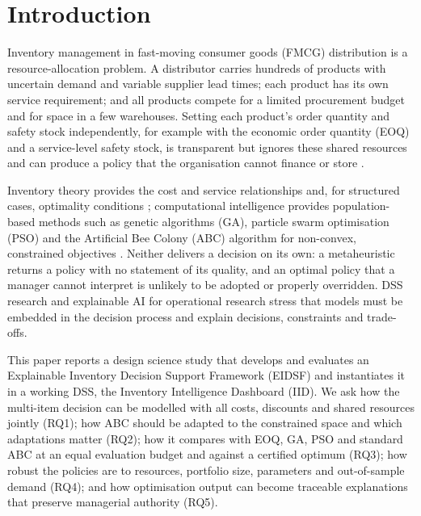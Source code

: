 \documentclass[preprint,12pt,authoryear]{elsarticle}
\begin{document}
\section{Introduction}\label{sec:intro}

Inventory management in fast-moving consumer goods (FMCG) distribution is a resource-allocation problem. A distributor carries hundreds of products with uncertain demand and variable supplier lead times; each product has its own service requirement; and all products compete for a limited procurement budget and for space in a few warehouses. Setting each product's order quantity and safety stock independently, for example with the economic order quantity (EOQ) and a service-level safety stock, is transparent but ignores these shared resources and can produce a policy that the organisation cannot finance or store \citep{Silver1998,Axsater2015,Zipkin2000}.

Inventory theory provides the cost and service relationships and, for structured cases, optimality conditions \citep{HadleyWhitin1963,RosenblattRothblum1990}; computational intelligence provides population-based methods such as genetic algorithms (GA), particle swarm optimisation (PSO) and the Artificial Bee Colony (ABC) algorithm for non-convex, constrained objectives \citep{Holland1975,Kennedy1995,Karaboga2007,Talbi2009}. Neither delivers a decision on its own: a metaheuristic returns a policy with no statement of its quality, and an optimal policy that a manager cannot interpret is unlikely to be adopted or properly overridden. DSS research \citep{Shim2002,Arnott2014} and explainable AI for operational research \citep{DeBock2024,Coussement2024,Olan2024} stress that models must be embedded in the decision process and explain decisions, constraints and trade-offs.

This paper reports a design science study \citep{Hevner2004,Peffers2007,GregorHevner2013} that develops and evaluates an Explainable Inventory Decision Support Framework (EIDSF) and instantiates it in a working DSS, the Inventory Intelligence Dashboard (IID). We ask how the multi-item decision can be modelled with all costs, discounts and shared resources jointly (RQ1); how ABC should be adapted to the constrained space and which adaptations matter (RQ2); how it compares with EOQ, GA, PSO and standard ABC at an equal evaluation budget and against a certified optimum (RQ3); how robust the policies are to resources, portfolio size, parameters and out-of-sample demand (RQ4); and how optimisation output can become traceable explanations that preserve managerial authority (RQ5).
\end{document}
